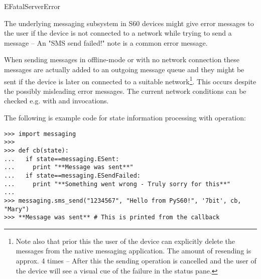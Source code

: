 \begin{datadesc}{EFatalServerError}
\end{datadesc}

The underlying messaging subsystem in S60 devices might give error messages to 
the user if the device is not connected to a network while trying to send a 
message -- An "SMS send failed!" note is a common error message.

When sending messages in offline-mode or with no network connection these 
messages are actually added to an outgoing message queue and they might be sent 
if the device is later on connected to a suitable network\footnote{Note also 
that prior this the user of the device can explicitly delete the messages from 
the native messaging application. The amount of resending is approx. 4 times --
After this the sending operation is cancelled and the user of the device will 
see a visual cue of the failure in the status pane.}. This occurs despite the 
possibly misleading error messages. The current network conditions can be 
checked e.g. with  and 
 invocations.

The following is example code for state information processing with 
 operation:

\begin{verbatim}
>>> import messaging
>>>
>>> def cb(state):
...   if state==messaging.ESent:
...     print "**Message was sent**"
...   if state==messaging.ESendFailed:
...     print "**Something went wrong - Truly sorry for this**"
...
>>> messaging.sms_send("1234567", "Hello from PyS60!", '7bit', cb, "Mary")
>>> **Message was sent** # This is printed from the callback
\end{verbatim}
